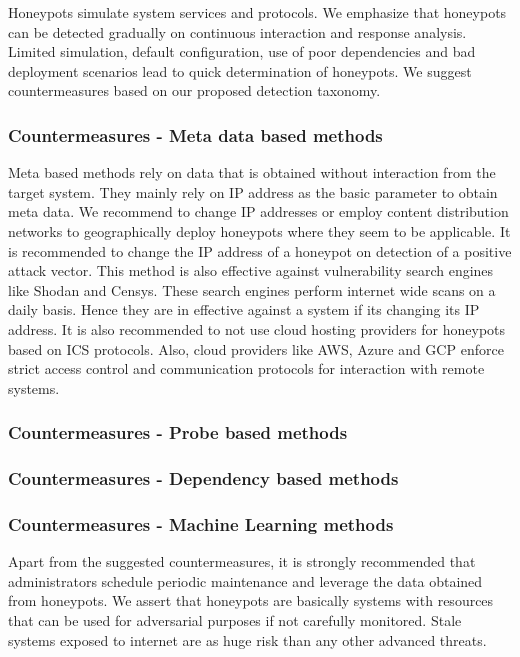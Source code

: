 \documentclass[../main.tex]{subfiles}
\begin{document}
Honeypots simulate system services and protocols. We emphasize that honeypots can be detected gradually on continuous interaction and response analysis. Limited simulation, default configuration, use of poor dependencies and bad deployment scenarios lead to quick determination of honeypots. We suggest countermeasures based on our proposed detection taxonomy. 

\subsubsection{Countermeasures - Meta data based methods}
Meta based methods rely on data that is obtained without interaction from the target system. They mainly rely on IP address as the basic parameter to obtain meta data. We recommend to change IP addresses or employ content distribution networks to geographically deploy honeypots where they seem to be applicable.  It is recommended to change the IP address of a honeypot on detection of a positive attack vector. This method is also effective against vulnerability search engines like Shodan and Censys. These search engines perform internet wide scans on a daily basis. Hence they are in effective against a system if its changing its IP address. It is also recommended to not use cloud hosting providers for honeypots based on ICS protocols. Also, cloud providers like AWS, Azure and GCP enforce strict access control and communication protocols for interaction with remote systems. 


\subsubsection{Countermeasures - Probe based methods}

\subsubsection{Countermeasures - Dependency based methods}

\subsubsection{Countermeasures - Machine Learning methods}
\newline
Apart from the suggested countermeasures, it is strongly recommended that administrators schedule periodic maintenance and leverage the data obtained from honeypots. We assert that honeypots are basically systems with resources that can be used for adversarial purposes if not carefully monitored. Stale systems exposed to internet are as huge risk than any other advanced threats. 
\end{document}
